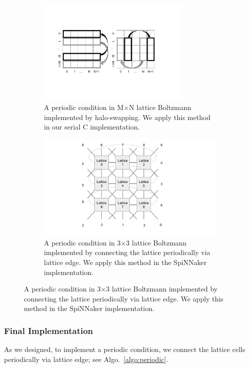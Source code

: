 \begin{figure}[!tb]

\begin{subfigure}[b]{1\textwidth}
       \centering
       \includegraphics[width=0.8\textwidth]{figures/haloswap.png}
       \caption{A periodic condition in M$\times$N lattice Boltzmann implemented by halo-swapping. We apply this method in our serial C implementation.}
       \label{fig:haloswap}
   \end{subfigure}
   \begin{subfigure}[b]{1\textwidth}
       \includegraphics[width=\textwidth]{figures/2dfabric.png}
       \caption{A periodic condition in 3$\times$3 lattice Boltzmann implemented by connecting the lattice periodically via lattice edge. We apply this method in the SpiNNaker implementation.}
       \label{fig:spinnaker_halo}
   \end{subfigure}
\end{figure}

\subsubsection{Final Implementation}
As we designed, to implement a periodic condition, we connect the lattice cells periodically via lattice edge; see Algo.~\ref{algo:periodic}.


